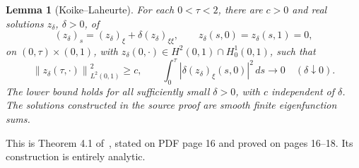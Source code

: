\documentclass[11pt]{article}
\newtheorem{lemma}[proposition]{Lemma}
\newcommand{\norm}[1]{\left\|#1\right\|}
\begin{document}
\begin{lemma}[Koike--Laheurte]\label{lem:witness}
For each $0<\tau<2$, there are $c>0$ and real solutions $z_\delta$,
$\delta>0$, of
\[
(z_\delta)_s=(z_\delta)_\xi+\delta(z_\delta)_{\xi\xi},
\qquad z_\delta(s,0)=z_\delta(s,1)=0,
\]
on $(0,\tau)\times(0,1)$, with
$z_\delta(0,\cdot)\in H^2(0,1)\cap H_0^1(0,1)$, such that
\begin{equation}\label{eq:witness}
\norm{z_\delta(\tau,\cdot)}_{L^2(0,1)}^2\geq c,
\qquad
\int_0^\tau|\delta(z_\delta)_\xi(s,0)|^2\,ds\longrightarrow0
\quad(\delta\downarrow0).
\end{equation}
The lower bound holds for all sufficiently small $\delta>0$, with $c$
independent of $\delta$. The solutions constructed in the source proof
are smooth finite eigenfunction sums.
\end{lemma}

This is Theorem 4.1 of~\cite{kl}, stated on PDF page 16 and proved on
pages 16--18. Its construction is entirely analytic.
\end{document}
